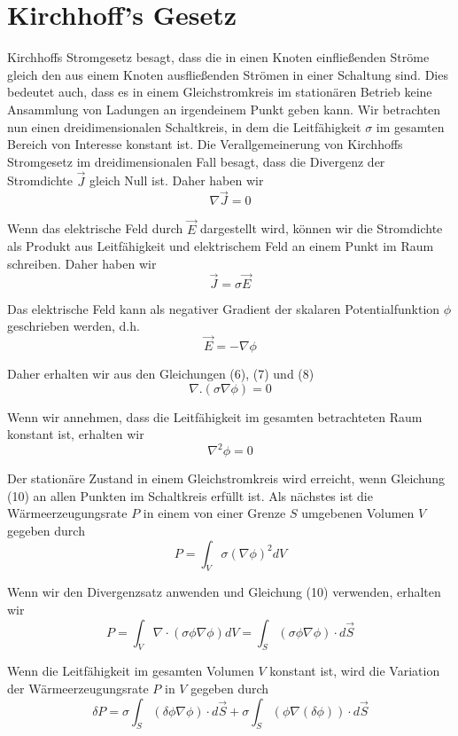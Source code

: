 %
%
%
%
\section{Kirchhoff's Gesetz
\label{circuit:section:teil1}}
Kirchhoffs Stromgesetz besagt, dass die in einen Knoten einfließenden Ströme gleich den aus einem Knoten ausfließenden Strömen in einer Schaltung sind. Dies bedeutet auch, dass es in einem Gleichstromkreis im stationären Betrieb keine Ansammlung von Ladungen an irgendeinem Punkt geben kann. Wir betrachten nun einen dreidimensionalen Schaltkreis, in dem die Leitfähigkeit $\sigma$ im gesamten Bereich von Interesse konstant ist. Die Verallgemeinerung von Kirchhoffs Stromgesetz im dreidimensionalen Fall besagt, dass die Divergenz der Stromdichte $\vec{J}$ gleich Null ist. Daher haben wir
\begin{equation}
	\nabla  \vec{J}=0
	\label{circuit:current_density_1}
\end{equation}




Wenn das elektrische Feld durch $\vec{E}$ dargestellt wird, können wir die Stromdichte als Produkt aus Leitfähigkeit und elektrischem Feld an einem Punkt im Raum schreiben. Daher haben wir
$$
\vec{J}=\sigma \vec{E}
$$

Das elektrische Feld kann als negativer Gradient der skalaren Potentialfunktion $\phi$ geschrieben werden, d.h.
$$
\vec{E}=-\nabla \phi
$$

Daher erhalten wir aus den Gleichungen (6), (7) und (8)
$$
\nabla .(\sigma \nabla \phi)=0
$$

Wenn wir annehmen, dass die Leitfähigkeit im gesamten betrachteten Raum konstant ist, erhalten wir
$$
\nabla^2 \phi=0
$$

Der stationäre Zustand in einem Gleichstromkreis wird erreicht, wenn Gleichung (10) an allen Punkten im Schaltkreis erfüllt ist. Als nächstes ist die Wärmeerzeugungsrate $P$ in einem von einer Grenze $S$ umgebenen Volumen $V$ gegeben durch
$$
P=\int_V \sigma(\nabla \phi)^2 d V
$$

Wenn wir den Divergenzsatz anwenden und Gleichung (10) verwenden, erhalten wir
$$
P=\int_V \nabla \cdot(\sigma \phi \nabla \phi) d V=\int_S(\sigma \phi \nabla \phi) \cdot d \vec{S}
$$

Wenn die Leitfähigkeit im gesamten Volumen $V$ konstant ist, wird die Variation der Wärmeerzeugungsrate $P$ in $V$ gegeben durch
$$
\delta P=\sigma \int_S(\delta \phi \nabla \phi) \cdot d \vec{S}+\sigma \int_S(\phi \nabla(\delta \phi)) \cdot d \vec{S}
$$

